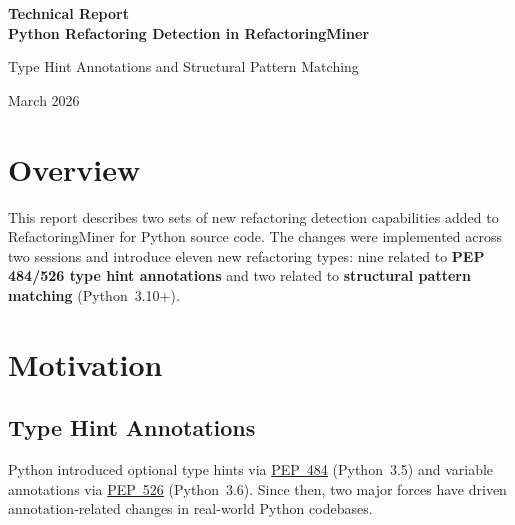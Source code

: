 \documentclass[11pt,a4paper]{article}
\begin{document}
\begin{titlepage}
  \centering
  \vspace*{3cm}
  {\LARGE\bfseries Technical Report\\[0.5em]
   Python Refactoring Detection in RefactoringMiner\par}
  \vspace{1.5cm}
  {\large Type Hint Annotations and Structural Pattern Matching\par}
  \vspace{2cm}
  {\normalsize March 2026\par}
  \vfill
\end{titlepage}

\tableofcontents
\newpage

\section{Overview}

This report describes two sets of new refactoring detection capabilities added to RefactoringMiner for Python source code. The changes were implemented across two sessions and introduce eleven new refactoring types: nine related to \textbf{PEP 484/526 type hint annotations} and two related to \textbf{structural pattern matching} (Python~3.10+).

\section{Motivation}

\subsection{Type Hint Annotations}

Python introduced optional type hints via \href{https://peps.python.org/pep-0484/}{PEP~484} (Python~3.5) and variable annotations via \href{https://peps.python.org/pep-0526/}{PEP~526} (Python~3.6). Since then, two major forces have driven annotation-related changes in real-world Python codebases.
\end{document}

